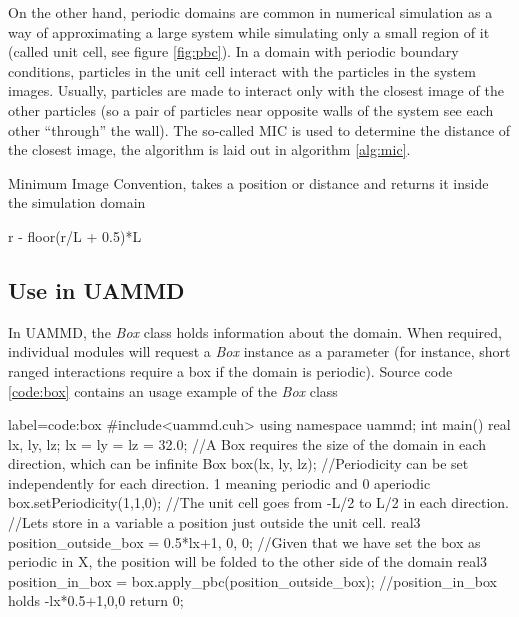 \documentclass[ twoside,openright,titlepage,numbers=noenddot,%
headinclude,footinclude,cleardoublepage=empty,abstract=on,
BCOR=5mm,paper=a4,fontsize=11pt, dvipsnames
]{scrreprt}
\newcommand{\uammd}{\gls{UAMMD}\xspace}
\begin{document}
On the other hand, periodic domains are common in numerical simulation as a way of approximating a large system while simulating only a small region of it (called unit cell, see figure \ref{fig:pbc}). In a domain with periodic boundary conditions, particles in the unit cell interact with the particles in the system images. Usually, particles are made to interact only with the closest image of the other particles (so a pair of particles near opposite walls of the system see each other ``through'' the wall). The so-called \gls{MIC} is used to determine the distance of the closest image, the algorithm is laid out in algorithm \ref{alg:mic}.

\begin{algorithm}
  \caption{Minimum Image Convention, takes a position or distance and returns it inside the simulation domain}
  \label{alg:mic}
  \begin{algorithmic}[1]
    \State \Return r - floor(r/L + 0.5)*L
    \EndFunction
  \end{algorithmic}
\end{algorithm}

\subsection*{Use in UAMMD}
In \uammd, the \emph{Box} class holds information about the domain. When required, individual modules will request a \emph{Box} instance as a parameter (for instance, short ranged interactions require a box if the domain is periodic). Source code \ref{code:box} contains an usage example of the \emph{Box} class
\begin{code2}{label=code:box}
#include<uammd.cuh>
using namespace uammd;
int main(){
  real lx, ly, lz;
  lx = ly = lz = 32.0;
  //A Box requires the size of the domain in each direction, which can be infinite
  Box box({lx, ly, lz});
  //Periodicity can be set independently for each direction. 1 meaning periodic and 0 aperiodic
  box.setPeriodicity(1,1,0);
  //The unit cell goes from -L/2 to L/2 in each direction.
  //Lets store in a variable a position just outside the unit cell.
  real3 position_outside_box = {0.5*lx+1, 0, 0};
  //Given that we have set the box as periodic in X, the position will be folded to the other side of the domain
  real3 position_in_box = box.apply_pbc(position_outside_box);
  //position_in_box holds {-lx*0.5+1,0,0}
  return 0; 
}
\end{code2}
\end{document}
